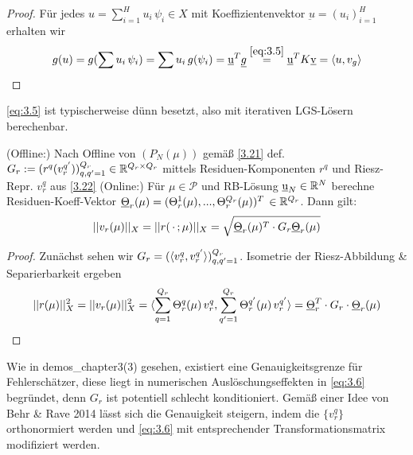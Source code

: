 \begin{proof}
	Für jedes $u = \sum_{i=1}^H u_i \, \psi_i \in X$ mit Koeffizientenvektor $\underbar u = (u_i)_{i=1}^H$ erhalten wir
	\[
		g(u) = g(\sum u_i \, \psi_i) = \sum u_i \, g(\psi_i) = \underbar u^T \underline{g} \overset{\ref{eq:3.5}}{=} \underbar u^T K \underbar v = \langle u, v_g \rangle
	\] 
\end{proof}

\begin{bem}
	\ref{eq:3.5} ist typischerweise dünn besetzt, also mit iterativen LGS-Lösern berechenbar.
\end{bem}

\begin{kor}
\label{3.24}
	(Offline:) Nach Offline von $(P_N(\mu))$ gemäß \ref{3.21} def. $G_r := (r^q (v_r^{q'}))_{q,q' =1}^{Q_r} \in \mathbb{R}^{Q_r \times Q_r}$ mittels Residuen-Komponenten $r^q$ und Riesz-Repr. $v_r^q$ aus \ref{3.22}
	(Online:) Für $\mu \in \mathcal{P}$ und RB-Lösung $\underbar u_N \in \mathbb{R}^N$ berechne Residuen-Koeff-Vektor $\underline{\Theta}_r(\mu) = (\Theta_r^1(\mu),...,\Theta_r^{Q_r} (\mu))^T \, \in \mathbb{R}^{Q_r}$.
	Dann gilt: 
	\begin{align}
	||v_r(\mu)||_X = ||r(\,\cdot\,;\mu)||_X = \sqrt{\underline{\Theta}_r(\mu)^T \cdot G_r \underline{\Theta}_r(\mu)}
	\label{eq:3.6}
	\end{align}
\end{kor}

\begin{proof}
	Zunächst sehen wir $G_r = (\langle v_r^q, v_r^{q'} \rangle)_{q, q' = 1}^{Q_r}$. Isometrie der Riesz-Abbildung \& Separierbarkeit ergeben
	\[
		||r(\mu)||_X^2 = ||v_r(\mu)||_X^2 = \langle \sum_{q=1}^{Q_r} \Theta_r^q(\mu) \, v_r^q, \sum_{q'=1}^{Q_r} \Theta_r^{q'}(\mu) \, v_r^{q'} \rangle = \underline{\Theta}_r^T \cdot G_r \cdot \underline{\Theta}_r (\mu) 
	\]
\end{proof}

\begin{bem}
	Wie in \textsf{demos\_chapter3(3)} gesehen, existiert eine Genauigkeitsgrenze für Fehlerschätzer, diese liegt in numerischen Auslöschungseffekten in \ref{eq:3.6} begründet, denn $G_r$ ist potentiell schlecht konditioniert. Gemäß einer Idee von Behr \& Rave 2014 lässt sich die Genauigkeit steigern, indem die $\{v_r^q\}$ orthonormiert werden und \ref{eq:3.6} mit entsprechender Transformationsmatrix modifiziert werden.
\end{bem}

